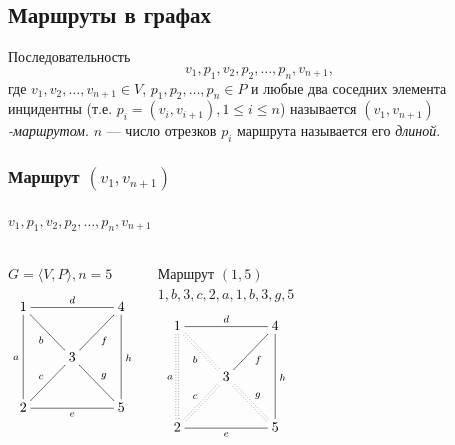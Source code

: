 

\subsection{Маршруты в графах}

Последовательность 
\begin{equation}
    \label{eq:graph:path}
    v_1,p_1,v_2,p_2,\ldots,p_{n},v_{n+1},
\end{equation}
где $v_1,v_2,\ldots,v_{n+1}\in V$, $p_1,p_2,\ldots,p_{n}\in P$ и любые два соседних элемента инцидентны (т.е. $p_i=(v_i,v_{i+1}), 1\leq i\leq n$) называется \emph{$(v_1,v_{n+1})$-маршрутом}. $n$ --- число отрезков $p_i$ маршрута называется его \emph{длиной}.

\begin{frame}
    \frametitle{Маршрут $(v_1,v_{n+1})$}
    \framesubtitle{$v_1,p_1,v_2,p_2,\ldots,p_{n},v_{n+1}$}

    \begin{columns}
            \begin{block}{$G=\langle V,P\rangle,n=5$}
                \[
                    {\xymatrix{
                        1 \ar@{-}[dd]_{a} \ar@{-}[rr]^{d} \ar@{-}[dr]_{b}
                            &*{}
                                &4 \ar@{-}[dd]^{h}
                                    \\
                        *{} 
                            &3 \ar@{-}[ur]_{f} \ar@{-}[dr]^{g}
                                &*{}
                                    \\
                        2  \ar@{-}[ur]^{c} \ar@{-}[rr]_{e}
                            &*{}
                                &5
                    }}
                \]
            \end{block}
        
            \begin{block}{Маршрут $(1,5)$ \\ $1,b,3,c,2,a,1,b,3,g,5$}
                \[
                    {\xymatrix{
                        1 \ar@{:}[dd]_{a} \ar@{-}[rr]^{d} \ar@{:}[dr]_{b}
                            &*{}
                                &4 \ar@{-}[dd]^{h}
                                    \\
                        *{} 
                            &3 \ar@{-}[ur]_{f} \ar@{:}[dr]^{g}
                                &*{}
                                    \\
                        2  \ar@{:}[ur]^{c} \ar@{-}[rr]_{e}
                            &*{}
                                &5
                    }}
                \]
            \end{block}
    \end{columns}
\end{frame}

